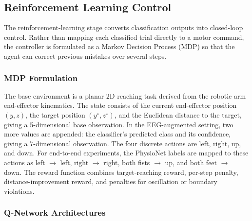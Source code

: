 \documentclass[12pt, a4paper]{article}
\begin{document}
\subsection{Reinforcement Learning Control}

The reinforcement-learning stage converts classification outputs into closed-loop control. Rather than mapping each classified trial directly to a motor command, the controller is formulated as a Markov Decision Process (MDP) so that the agent can correct previous mistakes over several steps.

\subsubsection{MDP Formulation}

The base environment is a planar 2D reaching task derived from the robotic arm end-effector kinematics. The state consists of the current end-effector position $(y, z)$, the target position $(y^\star, z^\star)$, and the Euclidean distance to the target, giving a 5-dimensional base observation. In the EEG-augmented setting, two more values are appended: the classifier's predicted class and its confidence, giving a 7-dimensional observation. The four discrete actions are left, right, up, and down. For end-to-end experiments, the PhysioNet labels are mapped to these actions as left $\rightarrow$ left, right $\rightarrow$ right, both fists $\rightarrow$ up, and both feet $\rightarrow$ down. The reward function combines target-reaching reward, per-step penalty, distance-improvement reward, and penalties for oscillation or boundary violations.

\subsubsection{Q-Network Architectures}
\end{document}
